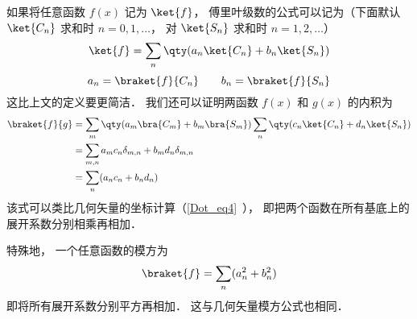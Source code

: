 如果将任意函数 $f(x)$ 记为 $\ket{f}$， 傅里叶级数的公式可以记为（下面默认 $\ket{C_n}$ 求和时 $n = 0, 1, \dots$， 对 $\ket{S_n}$ 求和时 $n = 1, 2, \dots$）
\begin{equation}
\ket{f} = \sum_n \qty(a_n \ket{C_n} + b_n \ket{S_n})
\end{equation}
\begin{equation}
a_n = \braket{f}{C_n}
\qquad
b_n = \braket{f}{S_n}
\end{equation}
这比上文的定义要更简洁． 我们还可以证明两函数 $f(x)$ 和 $g(x)$ 的内积为
\begin{equation}
\begin{aligned}
\braket{f}{g} &= \sum_m \qty(a_m \bra{C_m} + b_m \bra{S_m}) \sum_n \qty(c_n \ket{C_n} + d_n \ket{S_n})\\
&= \sum_{m, n} a_m c_n \delta_{m, n} + b_m d_n \delta_{m, n}\\
&= \sum_n (a_n c_n + b_n d_n)
\end{aligned}
\end{equation}
该式可以类比几何矢量的坐标计算（\autoref{Dot_eq4}~）， 即把两个函数在所有基底上的展开系数分别相乘再相加．

特殊地， 一个任意函数的模方为
\begin{equation}
\braket{f} = \sum_n (a_n^2 + b_n^2)
\end{equation}
即将所有展开系数分别平方再相加． 这与几何矢量模方公式也相同．
